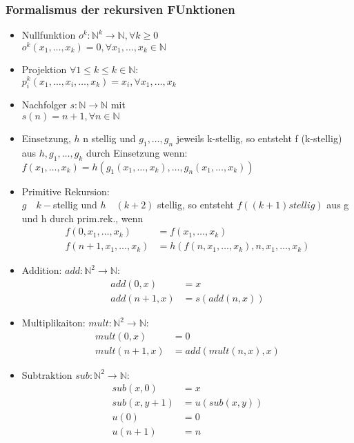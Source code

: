 \documentclass[a4paper, 10pt]{article}
\theoremstyle{definition}
\begin{document}
\subsubsection{Formalismus der rekursiven FUnktionen}
\begin{itemize}
    \item Nullfunktion $o^k:\mathbb{N}^k\to\mathbb{N},\forall k\geq 0$\\$o^k(x_1,\dots,x_k)=0,\forall x_1,\dots,x_k\in\mathbb{N}$
    \item Projektion $\forall 1\leq k \leq k\in\mathbb{N}$:\\$p_i^k(x_1,\dots,x_i,\dots,x_k)=x_i,
    \forall x_1,\dots,x_k$
    \item Nachfolger $s:\mathbb{N}\to\mathbb{N}$ mit\\$s(n)=n+1,\forall n\in\mathbb{N}$
    \item Einsetzung, $h$ n stellig und $g_1,\dots,g_n$ jeweils k-stellig, so entsteht f (k-stellig) aus $h,g_1,\dots,g_k$ durch Einsetzung wenn:\\
    $f(x_1,\dots,x_k)=h(g_1(x_1,\dots,x_k),\dots,g_n(x_1,\dots,x_k))$
    \item Primitive Rekursion:\\
    $g\quad k-$stellig und $h\quad(k+2)$ stellig, so entsteht $f((k+1)stellig)$ aus g und h durch prim.rek., wenn\\\begin{align*}
        f(0,x_1,\dots,x_k)&=f(x_1,\dots,x_k)\\
        f(n+1,x_1,\dots,x_k)&=h(f(n,x_1,\dots,x_k),n,x_1,\dots,x_k)
    \end{align*}
    \item Addition: $add:\mathbb{N}^2\to\mathbb{N}:$\\\begin{align*}
        add(0,x)&=x\\
        add(n+1,x)&=s(add(n,x))
    \end{align*}
    \item Multiplikaiton: $mult:\mathbb{N}^2\to\mathbb{N}:$\\\begin{align*}
        mult(0,x)&=0\\
        mult(n+1,x)&=add(mult(n,x),x)
    \end{align*}
    \item Subtraktion $sub:\mathbb{N}^2\to\mathbb{N}:$\\\begin{align*}
        sub(x,0)&=x\\
        sub(x,y+1)&=u(sub(x,y))\\
        u(0)&=0\\
        u(n+1)&=n
    \end{align*}
\end{itemize}
\end{document}

